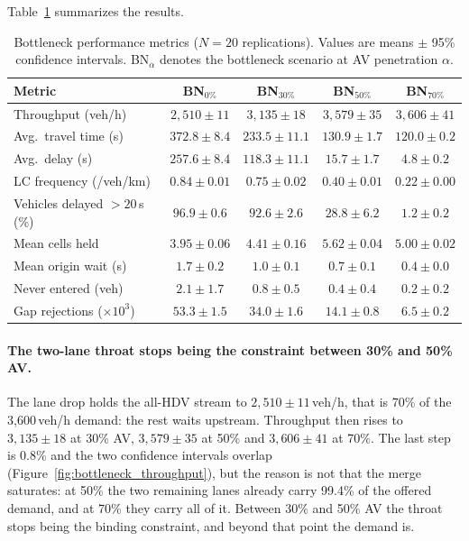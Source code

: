 \documentclass[review,authoryear]{elsarticle}
\begin{document}
Table~\ref{tab:results_bottleneck} summarizes the results.

\begin{table}[ht]
\centering
\caption{Bottleneck performance metrics ($N = 20$ replications). Values are means $\pm$ 95\% confidence intervals. BN$_\alpha$ denotes the bottleneck scenario at AV penetration $\alpha$.}
\label{tab:results_bottleneck}
\begin{tabular}{@{}lcccc@{}}
\toprule
Metric & BN$_{0\%}$ & BN$_{30\%}$ & BN$_{50\%}$ & BN$_{70\%}$ \\
\midrule
Throughput (veh/h) & $2{,}510 \pm 11$ & $3{,}135 \pm 18$ & $3{,}579 \pm 35$ & $3{,}606 \pm 41$ \\
Avg.\ travel time (s) & $372.8 \pm 8.4$ & $233.5 \pm 11.1$ & $130.9 \pm 1.7$ & $120.0 \pm 0.2$ \\
Avg.\ delay (s) & $257.6 \pm 8.4$ & $118.3 \pm 11.1$ & $15.7 \pm 1.7$ & $4.8 \pm 0.2$ \\
LC frequency (/veh/km) & $0.84 \pm 0.01$ & $0.75 \pm 0.02$ & $0.40 \pm 0.01$ & $0.22 \pm 0.00$ \\
Vehicles delayed $>20$\,s (\%) & $96.9 \pm 0.6$ & $92.6 \pm 2.6$ & $28.8 \pm 6.2$ & $1.2 \pm 0.2$ \\
Mean cells held & $3.95 \pm 0.06$ & $4.41 \pm 0.16$ & $5.62 \pm 0.04$ & $5.00 \pm 0.02$ \\
Mean origin wait (s) & $1.7 \pm 0.2$ & $1.0 \pm 0.1$ & $0.7 \pm 0.1$ & $0.4 \pm 0.0$ \\
Never entered (veh) & $2.1 \pm 1.7$ & $0.8 \pm 0.5$ & $0.4 \pm 0.4$ & $0.2 \pm 0.2$ \\
Gap rejections ($\times 10^3$) & $53.3 \pm 1.5$ & $34.0 \pm 1.6$ & $14.1 \pm 0.8$ & $6.5 \pm 0.2$ \\
\bottomrule
\end{tabular}
\end{table}

\paragraph{The two-lane throat stops being the constraint between 30\% and 50\% AV.}
The lane drop holds the all-HDV stream to $2{,}510 \pm 11$\,veh/h, that is 70\% of the 3{,}600\,veh/h demand: the rest waits upstream. Throughput then rises to $3{,}135 \pm 18$ at 30\% AV, $3{,}579 \pm 35$ at 50\% and $3{,}606 \pm 41$ at 70\%. The last step is 0.8\% and the two confidence intervals overlap (Figure~\ref{fig:bottleneck_throughput}), but the reason is not that the merge saturates: at 50\% the two remaining lanes already carry 99.4\% of the offered demand, and at 70\% they carry all of it. Between 30\% and 50\% AV the throat stops being the binding constraint, and beyond that point the demand is.
\end{document}
